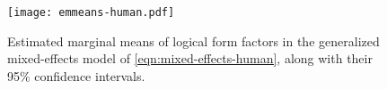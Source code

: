 \begin{figure}[!t]
    \centering
    \vspace{-5pt}
    \texttt{[image: emmeans-human.pdf]}
    \vspace{-5pt}
    \caption{
        Estimated marginal means of logical form factors in the generalized mixed-effects model of \cref{eqn:mixed-effects-human}, along with their 95\% confidence intervals.
        \label{fig:emmeans-human}
    }
    \vspace{-10pt}
\end{figure}
